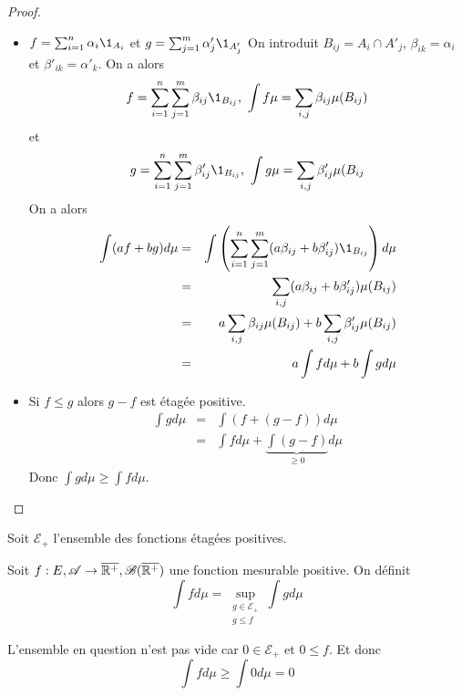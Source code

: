 \begin{proof}
	\begin{itemize}
		\item $ f = \sum_{i=1}^n \alpha_i \1_{A_i} $ et $ g = \sum_{j=1}^m \alpha'_j \1_{A'_j} $
		      On introduit $B_{ij} = A_i \cap A'_j$, $\beta_{ik} = \alpha_i$ et $\beta'_{ik} = \alpha'_k$.
		      On a alors
		      $$ f = \sum_{i=1}^n \sum_{j=1}^m \beta_{ij} \1_{B_{ij}}, \ \int f \mu = \sum_{i,j} \beta_{ij} \mu(B_{ij}) $$
		      et
		      $$ g = \sum_{i=1}^n \sum_{j=1}^m \beta'_{ij} \1_{B_{ij}}, \ \int g \mu = \sum_{i,j} \beta'_{ij} \mu(B_{ij} $$
		      On a alors
		      \begin{eqnarray*}
			      \int (af + bg) d\mu & = & \int \left( \sum_{i=1}^n \sum_{j=1}^m (a\beta_{ij} + b\beta'_{ij}) \1_{B_{ij}} \right) d\mu \\
			      & = & \sum_{i,j} (a\beta_{ij} + b\beta'_{ij}) \mu(B_{ij}) \\
			      & = & a \sum_{i,j} \beta_{ij} \mu(B_{ij}) + b \sum_{i,j} \beta'_{ij} \mu(B_{ij}) \\
			      & = & a \int f d\mu + b \int g d\mu
		      \end{eqnarray*}
		\item Si $f \leq g$ alors $g - f $ est étagée positive.
		      \begin{eqnarray*}
			      \int g d\mu & = & \int (f + (g-f)) d\mu \\
			      & = & \int f d\mu + \underbrace{\int (g-f)}_{\geq 0} d\mu
		      \end{eqnarray*}
		      Donc $\int g d\mu \geq \int f d\mu$.
	\end{itemize}
\end{proof}

Soit  $\mathcal{E}_+$ l'ensemble des fonctions étagées positives.


\begin{definition}
	Soit $f: E, \mathscr{A} \to \overline{\mathbb{R}^+}, \mathscr{B}(\overline{\mathbb{R}^+})$ une fonction mesurable positive.
	On définit
	$$ \int f d\mu = \sup\limits_{\substack{g \in \mathcal{E}_+ \\ g \leq f}} \int g d\mu $$
\end{definition}

\begin{remarque}
	L'ensemble en question n'est pas vide car $0 \in \mathcal{E}_+$ et $0 \leq f$. Et donc
	$$ \int f d\mu \geq \int 0 d\mu = 0 $$
\end{remarque}

